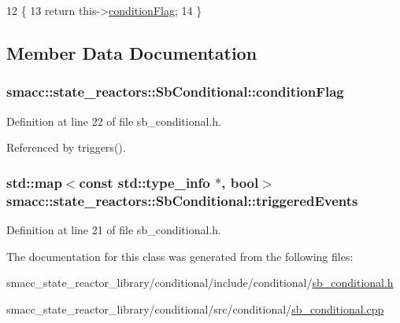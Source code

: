 \begin{DoxyCode}
12 \{
13     \textcolor{keywordflow}{return} this->\hyperlink{classsmacc_1_1state__reactors_1_1SbConditional_aba41e1943a9afaabcc03b7e9fe30e6f4}{conditionFlag};
14 \}
\end{DoxyCode}


\subsection{Member Data Documentation}
\subsubsection[{\texorpdfstring{condition\+Flag}{conditionFlag}}]{ smacc\+::state\+\_\+reactors\+::\+Sb\+Conditional\+::condition\+Flag\hspace{0.3cm}{\ttfamily [private]}}\hypertarget{classsmacc_1_1state__reactors_1_1SbConditional_aba41e1943a9afaabcc03b7e9fe30e6f4}{}\label{classsmacc_1_1state__reactors_1_1SbConditional_aba41e1943a9afaabcc03b7e9fe30e6f4}


Definition at line 22 of file sb\+\_\+conditional.\+h.



Referenced by triggers().

\subsubsection[{\texorpdfstring{triggered\+Events}{triggeredEvents}}]{\setlength{\rightskip}{0pt plus 5cm}std\+::map$<$const std\+::type\+\_\+info $\ast$, {\bf bool}$>$ smacc\+::state\+\_\+reactors\+::\+Sb\+Conditional\+::triggered\+Events\hspace{0.3cm}{\ttfamily [private]}}\hypertarget{classsmacc_1_1state__reactors_1_1SbConditional_a1dd37ec633d32afe86c8a7df475f6d53}{}\label{classsmacc_1_1state__reactors_1_1SbConditional_a1dd37ec633d32afe86c8a7df475f6d53}


Definition at line 21 of file sb\+\_\+conditional.\+h.



The documentation for this class was generated from the following files\+:\begin{DoxyCompactItemize}
\item 
smacc\+\_\+state\+\_\+reactor\+\_\+library/conditional/include/conditional/\hyperlink{sb__conditional_8h}{sb\+\_\+conditional.\+h}\item 
smacc\+\_\+state\+\_\+reactor\+\_\+library/conditional/src/conditional/\hyperlink{sb__conditional_8cpp}{sb\+\_\+conditional.\+cpp}\end{DoxyCompactItemize}
